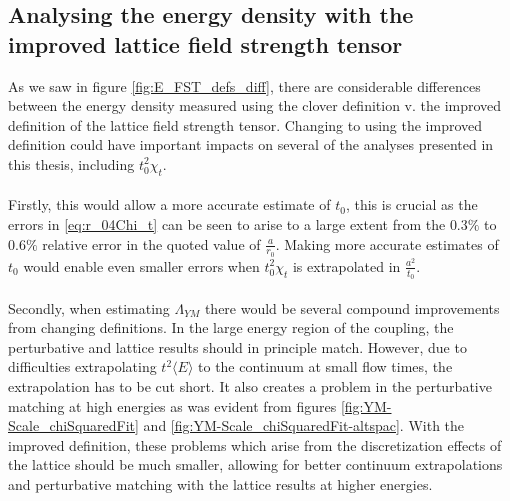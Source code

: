 \documentclass[a4paper,10pt]{book}
\begin{document}
\subsection{Analysing the energy density with the improved lattice field strength tensor}\label{sec:Edensity_w_ImprovedDef}
As we saw in figure \ref{fig:E_FST_defs_diff}, there are considerable differences between the energy density measured using the clover definition v. the improved definition of the lattice field strength tensor. Changing to using the improved definition could have important impacts on several of the analyses presented in this thesis, including $t_0^2\chi_t$.\\\\Firstly, this would allow a more accurate estimate of $t_0$, this is crucial as the errors in \eqref{eq:r_04Chi_t} can be seen to arise to a large extent from the $0.3\%$ to $0.6\%$ relative error in the quoted value of $\frac{a}{r_0}$. Making more accurate estimates of $t_0$ would enable even smaller errors when $t_0^2\chi_t$ is extrapolated in $\frac{a^2}{t_0}$.\\\\Secondly, when estimating $\Lambda_{YM}$ there would be several compound improvements from changing definitions. In the large energy region of the coupling, the perturbative and lattice results should in principle match. However, due to difficulties extrapolating $t^2\langle E \rangle$ to the continuum at small flow times, the extrapolation has to be cut short. It also creates a problem in the perturbative matching at high energies as was evident from figures \ref{fig:YM-Scale_chiSquaredFit} and  \ref{fig:YM-Scale_chiSquaredFit-altspac}. With the improved definition, these problems which arise from the discretization effects of the lattice should be much smaller, allowing for better continuum extrapolations and perturbative matching with the lattice results at higher energies.
\end{document}
